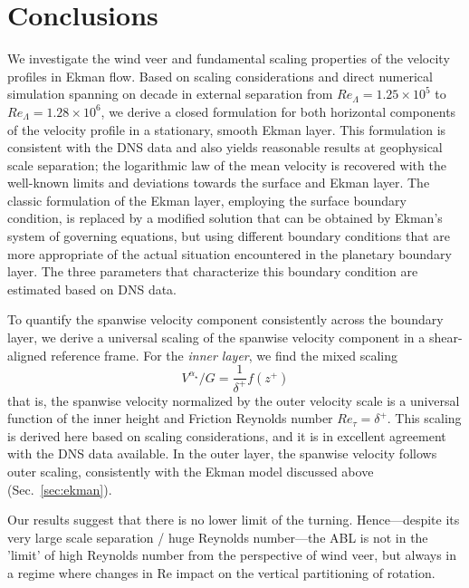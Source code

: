 \documentclass[smallcondensed,final]{svjour3}
\newcommand{\RE}{\mathrm{Re}}
\begin{document}
\section{Conclusions}
%
We investigate the wind veer and fundamental scaling properties of the velocity profiles in Ekman flow. 
%
Based on scaling considerations and direct numerical simulation spanning on decade in external separation from $Re_\Lambda=1.25 \times 10^5$ to $Re_\Lambda=1.28\times 10^6$, we derive a closed formulation for both horizontal components of the velocity profile in a stationary, smooth Ekman layer.  
% 
This formulation is consistent with the DNS data and also yields reasonable results  at geophysical scale separation; the logarithmic law of the mean velocity is recovered with the well-known limits and deviations towards the surface and Ekman layer. 
%
The classic formulation of the Ekman layer, employing the surface boundary condition, is replaced by a modified solution that can be obtained by Ekman's system of governing equations, but using different boundary conditions that are more appropriate of the actual situation encountered in the planetary boundary layer. 
% 
The three parameters that characterize this boundary condition are estimated based on DNS data. 
% 
\par
% 
To quantify the spanwise velocity component consistently across the boundary layer, we derive a universal scaling of the spanwise velocity component in a shear-aligned reference frame. For the \emph{inner layer}, we find the mixed scaling  
%
\begin{equation} 
  V^{\alpha_\star}/G = \frac{1}{\delta^+} f(z^+)
\end{equation}
%
that is, the spanwise velocity normalized by the outer velocity scale is a universal function of the inner height and Friction Reynolds number $Re_\tau = \delta^+$. 
% 
This scaling is derived here based on scaling considerations, and it is in excellent agreement with the DNS data available.   
% 
In the outer layer, the spanwise velocity follows outer scaling, consistently with the Ekman model discussed above (Sec.~\ref{sec:ekman}).
% 
\par
% 
Our results suggest that there is no lower limit of the turning. 
% 
Hence---despite its very large scale separation / huge Reynolds number---the ABL is not 
in the 'limit' of high Reynolds number from the perspective of wind veer, but always in a regime where 
changes in $\RE$ impact on the vertical partitioning of rotation. 
\end{document}
